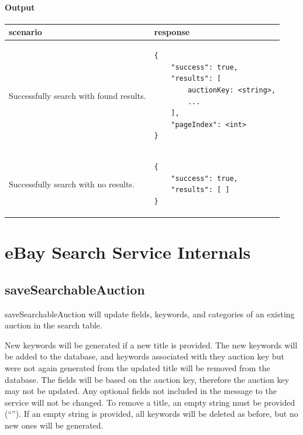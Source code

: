 \documentclass[12pt,a4paper]{article}
\begin{document}
\paragraph{Output}
\begin{center}
    \begin{tabular}{| p{7cm} | l |}
        \hline
        \textbf{scenario} & \textbf{response} \\
        \hline
        Successfully search with found results. &
        \begin{lstlisting}[language=tablejson,firstnumber=1]
{
    "success": true,
    "results": [ 
        auctionKey: <string>,
        ...
    ],
    "pageIndex": <int>
}
        \end{lstlisting} \\ 
        \hline
 \hline
        Successfully search with no results. &
        \begin{lstlisting}[language=tablejson,firstnumber=1]
{
    "success": true,
    "results": [ ]
}
         \end{lstlisting} \\ 
         \hline
    \end{tabular}
\end{center}

\pagebreak
\section{eBay Search Service Internals}
\subsection{saveSearchableAuction}
saveSearchableAuction will update fields, keywords, and categories of an
existing auction in the search table.

New keywords will be generated if a new title is provided. The new keywords
will be added to the database, and keywords associated with they auction key
but were not again generated from the updated title will be removed from the
database. The fields will be based on the auction key, therefore the auction
key may not be updated. Any optional fields not included in the message to the
service will not be changed. To remove a title, an empty string must be
provided (``''). If an empty string is provided, all keywords will be deleted
as before, but no new ones will be generated.
\end{document}
